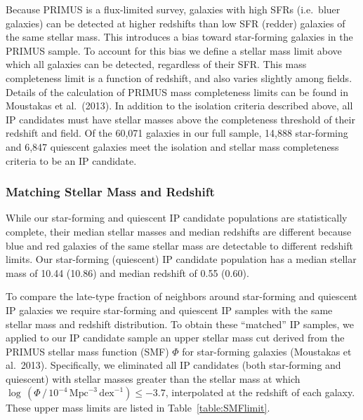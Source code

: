 Because PRIMUS is a flux-limited survey, galaxies with high SFRs (i.e.~bluer galaxies) can be detected at higher redshifts than low SFR (redder) galaxies of the same stellar mass.
This introduces a bias toward star-forming galaxies in the PRIMUS sample.
To account for this bias we define a stellar mass limit above which all galaxies can be detected, regardless of their SFR.
This mass completeness limit is a function of redshift, and also varies slightly among fields.
Details of the calculation of PRIMUS mass completeness limits can be found in Moustakas et al.~(2013).
In addition to the isolation criteria described above, all IP candidates must have stellar masses above the completeness threshold of their redshift and field.
Of the 60,071 galaxies in our full sample, 14,888 star-forming and 6,847 quiescent galaxies meet the isolation and stellar mass completeness criteria to be an IP candidate.

\subsubsection{Matching Stellar Mass and Redshift}\label{sec:IPsample_matching}

While our star-forming and quiescent IP candidate populations are statistically complete, their median stellar masses and median redshifts are different because blue and red galaxies of the same stellar mass are detectable to different redshift limits.
Our star-forming (quiescent) IP candidate population has a median stellar mass of 10.44 (10.86) and median redshift of 0.55 (0.60).

To compare the late-type fraction of neighbors around star-forming and quiescent IP galaxies we require star-forming and quiescent IP samples with the same stellar mass and redshift distribution.
To obtain these ``matched'' IP samples, we applied to our IP candidate sample an upper stellar mass cut derived from the PRIMUS stellar mass function (SMF) $\Phi$ for star-forming galaxies (Moustakas et al.~2013).
Specifically, we eliminated all IP candidates (both star-forming and quiescent) with stellar masses greater than the stellar mass at which ${\log\,(\Phi \,/\, 10^{-4}\,\text{Mpc}^{-3}\,\text{dex}^{-1}) \le -3.7}$, interpolated at the redshift of each galaxy.
These upper mass limits are listed in Table~\ref{table:SMFlimit}.



